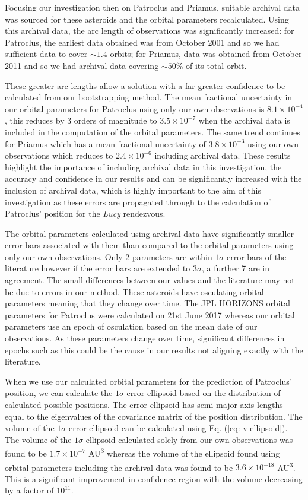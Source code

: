 \documentclass[10pt, twocolumn]{revtex4}    %
\begin{document}
Focusing our investigation then on Patroclus and Priamus, suitable archival data was sourced for these asteroids and the orbital parameters recalculated. Using this archival data, the arc length of observations was significantly increased: for Patroclus, the earliest data obtained was from October 2001 and so we had sufficient data to cover ${\sim}1.4$ orbits; for Priamus, data was obtained from October 2011 and so we had archival data covering ${\sim}50\%$ of its total orbit.

These greater arc lengths allow a solution with a far greater confidence to be calculated from our bootstrapping method. The mean fractional uncertainty in our orbital parameters for Patroclus using only our own observations is $8.1 \times 10^{-4}$, this reduces by 3 orders of magnitude to $3.5 \times 10^{-7}$ when the archival data is included in the computation of the orbital parameters. The same trend continues for Priamus which has a mean fractional uncertainty of $3.8 \times 10^{-3}$ using our own observations which reduces to $2.4 \times 10^{-6}$ including archival data. These results highlight the importance of including archival data in this investigation, the accuracy and confidence in our results and can be significantly increased with the inclusion of archival data, which is highly important to the aim of this investigation as these errors are propagated through to the calculation of Patroclus' position for the \textit{Lucy} rendezvous.

The orbital parameters calculated using archival data have significantly smaller error bars associated with them than compared to the orbital parameters using only our own observations. Only 2 parameters are within $1\sigma$ error bars of the literature however if the error bars are extended to $3\sigma$, a further 7 are in agreement. The small differences between our values and the literature may not be due to errors in our method. These asteroids have osculating orbital parameters meaning that they change over time. The JPL HORIZONS orbital parameters for Patroclus were calculated on 21st June 2017 whereas our orbital parameters use an epoch of osculation based on the mean date of our observations. As these parameters change over time, significant differences in epochs such as this could be the cause in our results not aligning exactly with the literature.

When we use our calculated orbital parameters for the prediction of Patroclus' position, we can calculate the $1\sigma$ error ellipsoid based on the distribution of calculated possible positions. The error ellipsoid has semi-major axis lengths equal to the eigenvalues of the covariance matrix of the position distribution. The volume of the $1\sigma$ error ellipsoid can be calculated using Eq. (\ref{eq: v ellipsoid}). The volume of the $1\sigma$ ellipsoid calculated solely from our own observations was found to be $1.7 \times 10^{-7}$ \si{AU^{3}} whereas the volume of the ellipsoid found using orbital parameters including the archival data was found to be $3.6 \times 10^{-18}$ \si{AU\cubed}. This is a significant improvement in confidence region with the volume decreasing by a factor of $10^{11}$. 
\end{document}
